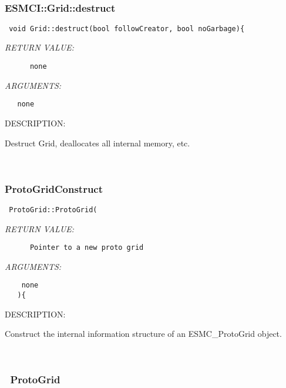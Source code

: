 \mbox{}\hrulefill\
 
\subsubsection [ESMCI::Grid::destruct] {ESMCI::Grid::destruct}


  
\begin{verbatim} void Grid::destruct(bool followCreator, bool noGarbage){\end{verbatim}{\em RETURN VALUE:}
\begin{verbatim}      none\end{verbatim}{\em ARGUMENTS:}
\begin{verbatim}   none\end{verbatim}
{\sf DESCRIPTION:\\ }


      Destruct Grid, deallocates all internal memory, etc. 
   
 
\mbox{}\hrulefill\
 
\subsubsection [ProtoGridConstruct] {ProtoGridConstruct}


  
\begin{verbatim} ProtoGrid::ProtoGrid(\end{verbatim}{\em RETURN VALUE:}
\begin{verbatim}      Pointer to a new proto grid\end{verbatim}{\em ARGUMENTS:}
\begin{verbatim}    none
   ){\end{verbatim}
{\sf DESCRIPTION:\\ }


      Construct the internal information structure of an ESMC\_ProtoGrid object.
   
 
\mbox{}\hrulefill\
 
\subsubsection [~ProtoGrid] {~ProtoGrid}


